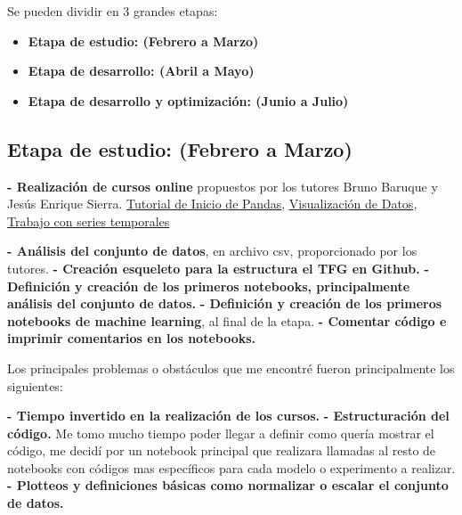 



Se pueden dividir en 3 grandes etapas:

\begin{itemize}
\tightlist
\item
	\textbf{Etapa de estudio: (Febrero a Marzo)}   	
\item
 	\textbf{Etapa de desarrollo: (Abril a Mayo)} 
\item
	\textbf{Etapa de desarrollo y optimización: (Junio a Julio)} 
\end{itemize}





\subsection{Etapa de estudio: (Febrero a Marzo)}




\textbf{- Realización de cursos online} propuestos por los tutores Bruno Baruque y Jesús Enrique Sierra.
\href{https://www.kaggle.com/learn/pandas}{Tutorial de Inicio de Pandas}, \href{https://www.kaggle.com/learn/data-visualization}{Visualización de Datos}, \href{https://www.kaggle.com/learn/time-series}{Trabajo con series temporales}

\textbf{- Análisis del conjunto de datos}, en archivo csv, proporcionado por los tutores.
\textbf{- Creación esqueleto para la estructura el TFG en Github.}
\textbf{- Definición y creación de los primeros notebooks, principalmente análisis del conjunto de datos.}
\textbf{- Definición y creación de los primeros notebooks de machine learning}, al final de la etapa.
\textbf{- Comentar código e imprimir comentarios en los notebooks.}

Los principales problemas o obstáculos que me encontré fueron principalmente los siguientes:

\textbf{- Tiempo invertido en la realización de los cursos.}
\textbf{- Estructuración del código.} Me tomo mucho tiempo poder llegar a definir como quería mostrar el código, me decidí por un notebook principal que realizara llamadas al resto de notebooks con códigos mas específicos para cada modelo o experimento a realizar.
\textbf{- Plotteos y definiciones básicas como normalizar o escalar el conjunto de datos.}



